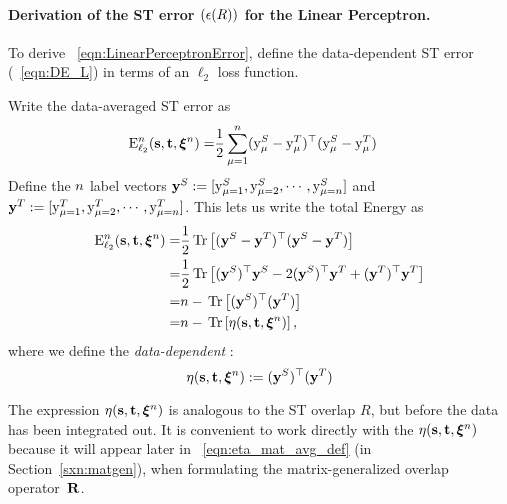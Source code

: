 \paragraph{Derivation of the ST error $(\epsilon(R))$ for the Linear Perceptron.}
To derive \EQN~\ref{eqn:LinearPerceptronError},
define the data-dependent ST error (\EQN~\ref{eqn:DE_L}) in terms of an $\ell_2$ loss function.

Write the data-averaged ST error as
\begin{align}
\mathbf{\mathrm{E}}^{n}_{\ell_2}({\mathbf{s}},{\mathbf{t}}, \boldsymbol{\xi}^{n})= & \frac{1}{2} \sum_{\mu=1}^{n}(\mathrm{y}_{\mu}^{S} - \mathrm{y}_{\mu}^{T})^{\top} (\mathrm{y}_{\mu}^{S} - \mathrm{y}_{\mu}^{T})
\label{eqn:deriveSTerror}
\end{align}
Define the $n$ label vectors  
$\mathbf{y}^{S}:=[\mathrm{y}_{\mu=1}^{S}, \mathrm{y}_{\mu=2}^{S}, \cdots, \mathrm{y}_{\mu=n}^{S}]$ and 
$\mathbf{y}^{T}:=[\mathrm{y}_{\mu=1}^{T}, \mathrm{y}_{\mu=2}^{T}, \cdots, \mathrm{y}_{\mu=n}^{T}]$.
This lets us write the total Energy as
\begin{align}
\nonumber
\mathbf{\mathrm{E}}^{n}_{\ell_2}({\mathbf{s}},{\mathbf{t}}, \boldsymbol{\xi}^{n})= & \frac{1}{2} \mbox{}\operatorname{Tr}\left[(\mathbf{y}^{S} - \mathbf{y}^{T})^{\top} (\mathbf{y}^{S} - \mathbf{y}^{T})\right] \\
\nonumber
=& \frac{1}{2} \mbox{}\operatorname{Tr}\left[(\mathbf{y}^{S})^{\top} \mathbf{y}^{S} - 2 (\mathbf{y}^{S})^{\top} \mathbf{y}^{T} + (\mathbf{y}^{T})^{\top} \mathbf{y}^{T} \right] \\
\nonumber
=& n - \mbox{}\operatorname{Tr}\left[(\mathbf{y}^{S})^{\top} (\mathbf{y}^{T})\right]\\
=& n- \mbox{}\operatorname{Tr}\left[\eta({\mathbf{s}},{\mathbf{t}},\boldsymbol{\xi}^{n})\right],
\label{eqn:deriveSTerror2}
\end{align}
where we define the \emph{data-dependent \SelfOverlap}:
\begin{equation}
\eta({\mathbf{s}},{\mathbf{t}},\boldsymbol{\xi}^{n}):=(\mathbf{y}^{S})^{\top}(\mathbf{y}^{T})
\end{equation}

The expression $\eta({\mathbf{s}},{\mathbf{t}},\boldsymbol{\xi}^{n})$ is analogous to the ST overlap $R$, but before the data has been integrated out.
It is convenient to work directly with
the \SelfOverlap $\eta({\mathbf{s}},{\mathbf{t}},\boldsymbol{\xi}^{n})$ because it will appear later in \EQN~\ref{eqn:eta_mat_avg_def} (in Section~\ref{sxn:matgen}), 
when formulating the matrix-generalized overlap operator~$\mathbf{R}$.

